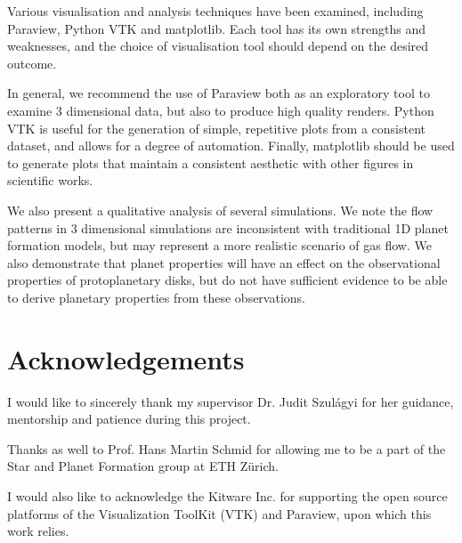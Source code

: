 \documentclass[preprint2]{aastex62}
\begin{document}
Various visualisation and analysis techniques have been examined, including Paraview, Python VTK and matplotlib. 
Each tool has its own strengths and weaknesses, and the choice of visualisation tool should depend on the desired outcome.

In general, we recommend the use of Paraview both as an exploratory tool to examine 3 dimensional data, but also to produce high quality renders. 
Python VTK is useful for the generation of simple, repetitive plots from a consistent dataset, and allows for a degree of automation. 
Finally, matplotlib should be used to generate plots that maintain a consistent aesthetic with other figures in scientific works.

We also present a qualitative analysis of several simulations. 
We note the flow patterns in 3 dimensional simulations are inconsistent with traditional 1D planet formation models, but may represent a more realistic scenario of gas flow.
We also demonstrate that planet properties will have an effect on the observational properties of protoplanetary disks, but do not have sufficient evidence to be able to derive planetary properties from these observations.

\section{Acknowledgements}
I would like to sincerely thank my supervisor Dr. Judit Szul\'{a}gyi for her guidance, mentorship and patience during this project.

Thanks as well to Prof. Hans Martin Schmid for allowing me to be a part of the Star and Planet Formation group at ETH Z\"{u}rich.

I would also like to acknowledge the Kitware Inc. for supporting the open source platforms of the Visualization ToolKit (VTK)  and Paraview, upon which this work relies.



\end{document}
